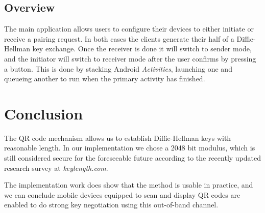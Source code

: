 \documentclass[conference, 11pt]{sty/IEEEtran}
\begin{document}
\subsection{Overview}
\label{ssec:overview}
The main application allows users to configure their devices to either initiate or receive a pairing request.
In both cases the clients generate their half of a Diffie-Hellman key exchange.
Once the receiver is done it will switch to sender mode, and the initiator will switch to receiver mode after the user confirms by pressing a button.
This is done by stacking Android \textit{Activities}, launching one and queueing another to run when the primary activity has finished.

\section{Conclusion}
\label{sec:conclusion}
The QR code mechanism allows us to establish Diffie-Hellman keys with reasonable length. In our implementation we chose a 2048 bit modulus, which is still considered secure for the foreseeable future according to the recently updated research survey at \textit{keylength.com}\cite{keylengthdotcom}.

The implementation work does show that the method is usable in practice, and we can conclude mobile devices equipped to scan and display QR codes are enabled to do strong key negotiation using this out-of-band channel.

\newpage
\end{document}
